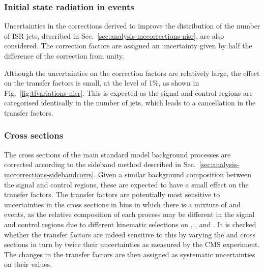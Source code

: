 
\subsubsection{Initial state radiation in \ttbar events}
Uncertainties in the corrections derived to improve the distribution of the 
number of ISR jets, described in Sec.~\ref{sec:analysis-mccorrections-nisr}, 
are also considered. The correction factors are assigned an uncertainty given 
by half the difference of the correction from unity.

Although the uncertainties on the correction factors are relatively large, the 
effect on the transfer factors is small, at the level of 1\%, as shown in 
Fig.~\ref{fig:tfvariations-nisr}. This is expected as the signal and control 
regions are categorised identically in the number of jets, which leads to a 
cancellation in the transfer factors.

\subsubsection{Cross sections}
The cross sections of the main standard model background processes are 
corrected according to the \mht sideband method described in 
Sec.~\ref{sec:analysis-mccorrections-sidebandcorrs}. Given a similar background 
composition between the signal and control regions, these are expected to have 
a small effect on the transfer factors. The \Tmutottw transfer factors are 
potentially most sensitive to uncertainties in the cross sections in bins in 
which there is a mixture of \wlj and \ttbar events, as the relative composition 
of each process may be different in the signal and control regions due to 
different kinematic selections on \alphat, \bdphi, and \mt. It is checked 
whether 
the transfer factors are indeed sensitive to this by varying the \wj and \ttbar 
cross sections in turn by twice their uncertainties as measured by the CMS 
experiment.
The changes in the transfer factors are then assigned as systematic 
uncertainties on their values.

